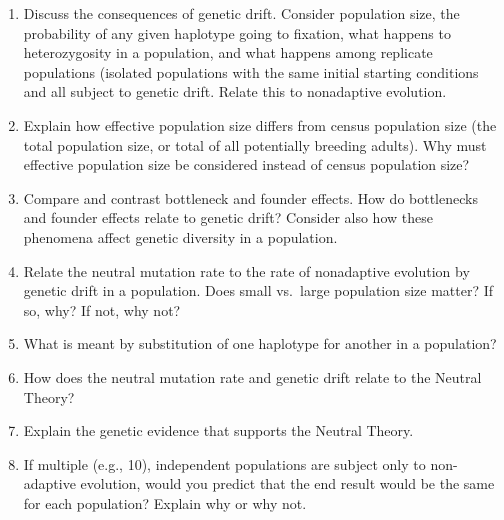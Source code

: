 \documentclass[letterpaper]{tufte-handout}
\begin{document}
\begin{enumerate}
	\item Discuss the consequences of genetic drift.  Consider population size, the probability of any given haplotype going to fixation, what happens to heterozygosity in a population, and what happens among replicate populations (isolated populations with the same initial starting conditions and all subject to genetic drift.  Relate this to nonadaptive evolution.

	\item Explain how effective population size differs from census population size (the total population size, or total of all potentially breeding adults).  Why must effective population size be considered instead of census population size? 

	\item Compare and contrast bottleneck and founder effects. How do bottlenecks and founder effects relate to genetic drift?  Consider also how these phenomena affect genetic diversity in a population. 

	\item Relate the neutral mutation rate to the rate of nonadaptive evolution by genetic drift in a population.  Does small vs.~large population size matter? If so, why?  If not, why not?

	\item What is meant by substitution of one haplotype for another in a population? 

	\item How does the neutral mutation rate and genetic drift relate to the Neutral Theory?
	
	\item Explain the genetic evidence that supports the Neutral Theory.

	\item If multiple (e.g., 10), independent populations are subject only to non-adaptive evolution, would you predict that the end result would be the same for each population? Explain why or why not.
\end{enumerate}
\end{document}
